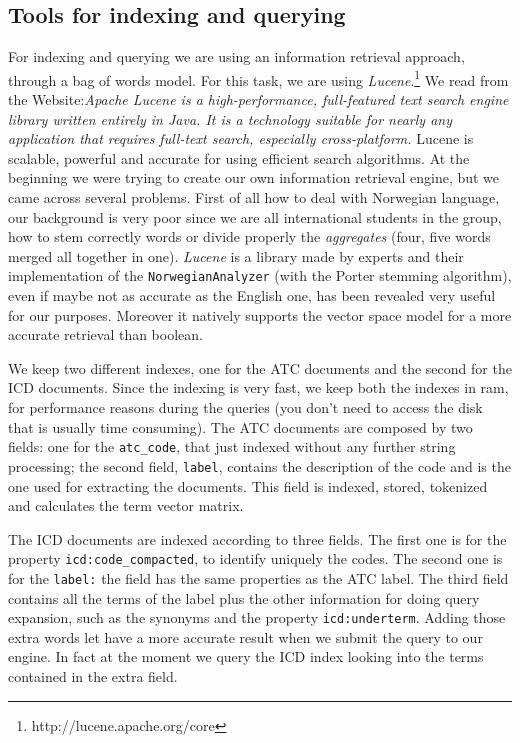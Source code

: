 \documentclass{article}
\begin{document}
\subsection{Tools for indexing and querying}
For indexing and querying we are using an information retrieval approach, through a bag of words model. For this task, we are using \emph{Lucene}.\footnote{http://lucene.apache.org/core} We read from the Website:\emph{Apache Lucene is a high-performance, full-featured text search engine library written entirely in Java. It is a technology suitable for nearly any application that requires full-text search, especially cross-platform.} Lucene is scalable, powerful and accurate for using efficient search algorithms.
At the beginning we were trying to create our own information retrieval engine, but we came across several problems. First of all how to deal with Norwegian language, our background is very poor since we are all international students in the group, how to stem correctly words or divide properly the \emph{aggregates} (four, five words merged all together in one). \emph{Lucene} is a library made by experts and their implementation of the \texttt{NorwegianAnalyzer} (with the Porter stemming algorithm), even if maybe not as accurate as the English one, has been revealed very useful for our purposes. Moreover it natively supports the vector space model for a more accurate retrieval than boolean.

We keep two different indexes, one for the ATC documents and the second for the ICD documents. Since the indexing is very fast, we keep both the indexes in ram, for performance reasons during the queries (you don't need to access the disk that is usually time consuming). The ATC documents are composed by two fields: one for the \texttt{atc\_code}, that just indexed without any further string processing; the second field, \texttt{label}, contains the description of the code and is the one used for extracting the documents. This field is indexed, stored, tokenized and calculates the term vector matrix.

The ICD documents are indexed according to three fields. The first one is for the property \texttt{icd:code\_compacted}, to identify uniquely the codes. The second one is for the \texttt{label:} the field has the same properties as the ATC label. The third field contains all the terms of the label plus the other information for doing query expansion, such as the synonyms and the property \texttt{icd:underterm}. Adding those extra words let have a more accurate result when we submit the query to our engine. In fact at the moment we query the ICD index looking into the terms contained in the extra field.
\end{document}
